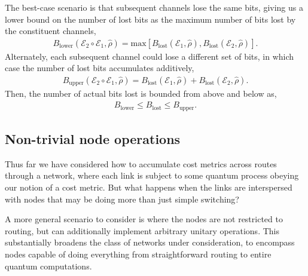 The best-case scenario is that subsequent channels lose the same bits, giving us a lower bound on the number of lost bits as the maximum number of bits lost by the constituent channels,
\begin{align}
B_\mathrm{lower}(\mathcal{E}_2\circ\mathcal{E}_1,\hat\rho) = \mathrm{max}[B_\mathrm{lost}(\mathcal{E}_1,\hat\rho), B_\mathrm{lost}(\mathcal{E}_2,\hat\rho)].
\end{align}
Alternately, each subsequent channel could lose a different set of bits, in which case the number of lost bits accumulates additively,
\begin{align}
B_\mathrm{upper}(\mathcal{E}_2\circ\mathcal{E}_1,\hat\rho) = B_\mathrm{lost}(\mathcal{E}_1,\hat\rho) + B_\mathrm{lost}(\mathcal{E}_2,\hat\rho). 
\end{align}
Then, the number of actual bits lost is bounded from above and below as,
\begin{align}
B_\mathrm{lower} \leq B_\mathrm{lost} \leq B_\mathrm{upper}.	
\end{align}


%
%

\subsection{Non-trivial node operations}

Thus far we have considered how to accumulate cost metrics across routes through a network, where each link is subject to some quantum process obeying our notion of a cost metric. But what happens when the links are interspersed with nodes that may be doing more than just simple switching?

A more general scenario to consider is where the nodes are not restricted to routing, but can additionally implement arbitrary unitary operations. This substantially broadens the class of networks under consideration, to encompass nodes capable of doing everything from straightforward routing to entire quantum computations.

